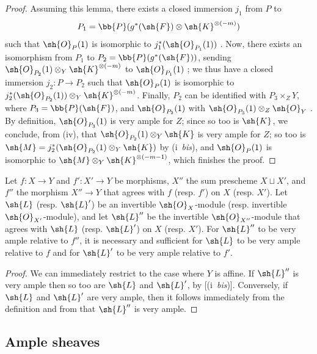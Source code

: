 \begin{proof}
Assuming this lemma, there exists a closed immersion $j_1$ from $P$ to
\[
  P_1 = \bb{P}(g^*(\sh{F})\otimes\sh{K}^{\otimes(-m)})
\]
such that $\sh{O}_P(1)$ is isomorphic to $j_1^*(\sh{O}_{P_1}(1))$ .
Now, there exists an isomorphism from $P_1$ to $P_2=\bb{P}(g^*(\sh{F}))$, sending $\sh{O}_{P_2}(1)\otimes_Y\sh{K}^{\otimes(-m)}$ to $\sh{O}_{P_1}(1)$ ;
we thus have a closed immersion $j_2:P\to P_2$ such that $\sh{O}_P(1)$ is isomorphic to $j_2^*(\sh{O}_{P_2}(1))\otimes_Y\sh{K}^{\otimes(-m)}$.
Finally, $P_2$ can be identified with $P_3\times_Z Y$, where $P_3=\bb{P}(\sh{F})$, and $\sh{O}_{P_2}(1)$ with $\sh{O}_{P_3}(1)\otimes_Z\sh{O}_Y$ .
By definition, $\sh{O}_{P_3}(1)$ is very ample for $Z$;
since so too is $\sh{K}$, we conclude, from (iv), that $\sh{O}_{P_2}(1)\otimes_Y\sh{K}$ is very ample for $Z$;
so too is $\sh{M}=j_2^*(\sh{O}_{P_2}(1)\otimes_Y\sh{K})$ by (i~\emph{bis}), and $\sh{O}_P(1)$ is isomorphic to $\sh{M}\otimes_Y\sh{K}^{\otimes(-m-1)}$, which finishes the proof.
\end{proof}

\begin{proposition}[4.4.11]
\label{II.4.4.11}
Let $f:X\to Y$ and $f':X'\to Y$ be morphisms, $X''$ the sum prescheme $X\sqcup X'$, and $f''$ the morphism $X''\to Y$ that agrees with $f$ (resp. $f'$) on $X$ (resp. $X'$).
Let $\sh{L}$ (resp. $\sh{L}'$) be an invertible $\sh{O}_X$-module (resp. invertible $\sh{O}_{X'}$-module), and let $\sh{L}''$ be the invertible $\sh{O}_{X''}$-module that agrees with $\sh{L}$ (resp. $\sh{L}'$) on $X$ (resp. $X'$).
For $\sh{L}''$ to be very ample relative to $f''$, it is necessary and sufficient for $\sh{L}$ to be very ample relative to $f$ and for $\sh{L}'$ to be very ample relative to $f'$.
\end{proposition}

\begin{proof}
We can immediately restrict to the case where $Y$ is affine.
If $\sh{L}''$ is very ample then so too are $\sh{L}$ and $\sh{L}'$, by [(i~\emph{bis})].
Conversely, if $\sh{L}$ and $\sh{L}'$ are very ample, then it follows immediately from the definition  and from  that $\sh{L}''$ is very ample.
\end{proof}


\subsection{Ample sheaves}
\label{subsection:II.4.5}

